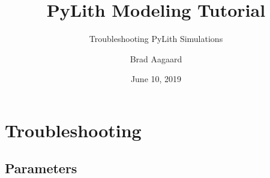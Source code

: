 \documentclass{beamer}
\title{PyLith Modeling Tutorial}
\subtitle{Troubleshooting PyLith Simulations}
\author{Brad Aagaard}
\institute{\texttt{[image: ../../logos/cig\_blackfg]}}
\date{June 10, 2019}
\begin{document}
\maketitle


\section{Troubleshooting}
\subsection{Parameters}

\begin{frame}
\end{frame}
\end{document}
